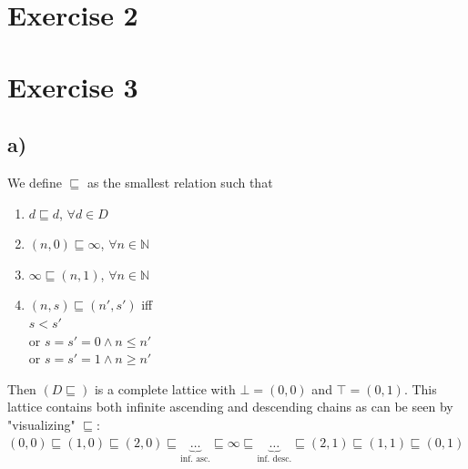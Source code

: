 \documentclass[fleqn,12pt]{article}
\begin{document}
\section*{Exercise 2}

\section*{Exercise 3}
\subsection*{a)}
We define $\sqsubseteq$ as the smallest relation such that\\
\begin{enumerate}
\item $d \sqsubseteq d$, $\forall d \in D$
\item $(n,0) \sqsubseteq \infty$, $\forall n \in \mathbb{N}$
\item $\infty \sqsubseteq (n,1)$, $\forall n \in \mathbb{N}$
\item $(n,s) \sqsubseteq (n',s')$ iff \\ 
	$s < s'$\\
	or $s=s'=0 \wedge n \leq n'$\\
	or $s=s'=1 \wedge n \geq n'$	
\end{enumerate}
Then $(D\sqsubseteq)$ is a complete lattice with $\bot=(0,0)$ and $\top=(0,1)$.
This lattice contains both infinite ascending and descending chains as can be seen by "visualizing" $\sqsubseteq$:\\
$(0,0)\sqsubseteq(1,0)\sqsubseteq(2,0)\sqsubseteq \underbrace{\dots}_\text{inf. asc.} \sqsubseteq\infty\sqsubseteq \underbrace{\dots}_\text{inf. desc.} \sqsubseteq (2,1) \sqsubseteq (1,1) \sqsubseteq (0,1)$
\newpage
\end{document}
